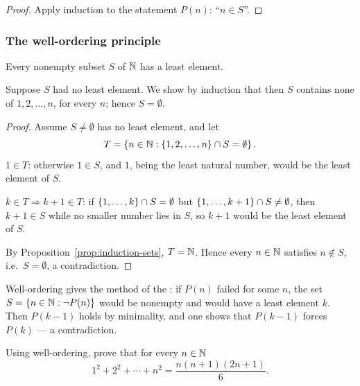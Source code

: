 \begin{proof}
    Apply induction to the statement $P(n)$: ``$n\in S$''.
\end{proof}

\subsubsection{The well-ordering principle}
\begin{theorem}\label{thm:wop}
    Every nonempty subset $S$ of $\mathbb{N}$ has a least element.
\end{theorem}

Suppose $S$ had no least element. We show by induction that then $S$
contains none of $1,2,\ldots,n$, for every $n$; hence $S=\emptyset$.

\begin{proof}
    Assume $S\neq\emptyset$ has no least element, and let
    \begin{equation*}
        T=\left\{n\in\mathbb{N} : \left\{1,2,\ldots,n\right\}\cap S=\emptyset\right\}.
    \end{equation*}
    \emph{$1\in T$}: otherwise $1\in S$, and $1$, being the least natural
    number, would be the least element of $S$.

    \emph{$k\in T\Rightarrow k+1\in T$}: if $\left\{1,\ldots,k\right\}\cap S=\emptyset$
    but $\left\{1,\ldots,k+1\right\}\cap S\neq\emptyset$, then $k+1\in S$ while no
    smaller number lies in $S$, so $k+1$ would be the least element of $S$.

    By Proposition~\ref{prop:induction-sets}, $T=\mathbb{N}$. Hence every $n\in\mathbb{N}$
    satisfies $n\notin S$, i.e.\ $S=\emptyset$, a contradiction.
\end{proof}

Well-ordering gives the method of the : if
$P(n)$ failed for some $n$, the set $S=\left\{n\in\mathbb{N}:\neg P(n)\right\}$ would be
nonempty and would have a least element $k$. Then $P(k-1)$ holds by
minimality, and one shows that $P(k-1)$ forces $P(k)$ --- a contradiction.

\begin{example}
    Using well-ordering, prove that for every $n\in\mathbb{N}$
    \begin{equation}\label{eq:sum-squares}
        1^2 + 2^2 + \cdots + n^2 = \frac{n(n + 1)(2n + 1)}{6}.
    \end{equation}
\end{example}

